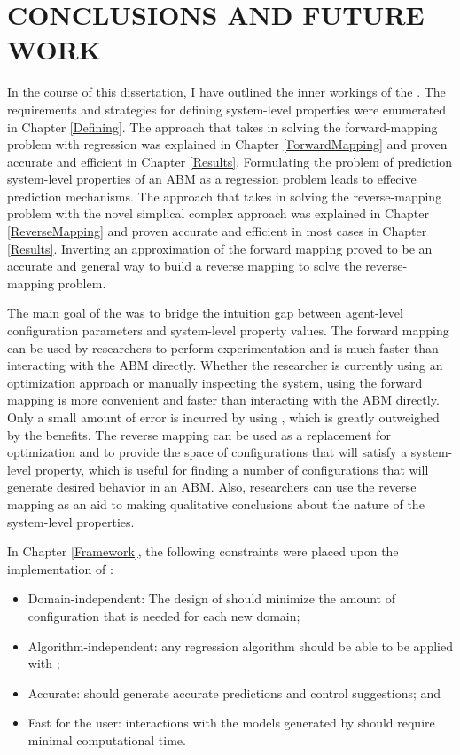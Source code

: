 \chapter{CONCLUSIONS AND FUTURE WORK}
\thispagestyle{plain}

\label{Conclusions}

In the course of this dissertation, I have outlined the inner workings of the \framework.
The requirements and strategies for defining system-level properties were enumerated in Chapter \ref{Defining}.
The approach that \fw takes in solving the forward-mapping problem with regression was explained in Chapter \ref{ForwardMapping} and proven accurate and efficient in Chapter \ref{Results}.
Formulating the problem of prediction  system-level properties of an ABM as a regression problem leads to effecive prediction mechanisms.
The approach that \fw takes in solving the reverse-mapping problem with the novel simplical complex approach was explained in Chapter \ref{ReverseMapping} and proven accurate and efficient in most cases in Chapter \ref{Results}.
Inverting an approximation of the forward mapping proved to be an accurate and general way to build a reverse mapping to solve the reverse-mapping problem.

The main goal of the \framework was to bridge the intuition gap between agent-level configuration parameters and system-level property values.
The forward mapping can be used by researchers to perform experimentation and is much faster than interacting with the ABM directly.
Whether the researcher is currently using an optimization approach or manually inspecting the system, using the forward mapping is  more convenient and faster than interacting with the ABM directly.
Only a small amount of error is incurred by using \fw, which is greatly outweighed by the benefits.
The reverse mapping can be used as a replacement for optimization and to provide the space of configurations that will satisfy a system-level property, which is useful for finding a number of configurations that will generate desired behavior in an ABM.
Also, researchers can use the reverse mapping as an aid to making qualitative conclusions about the nature of the system-level properties.

In Chapter \ref{Framework}, the following constraints were placed upon the implementation of \fw:
\begin{itemize}
      \item Domain-independent: The design of \fw should minimize the amount of configuration that is needed for each new domain;
      \item Algorithm-independent: any regression algorithm should be able to be applied with \fw;
      \item Accurate: \fw should generate accurate predictions and control suggestions; and
      \item Fast for the user: interactions with the models generated by \fw should require minimal computational time.
\end{itemize}


